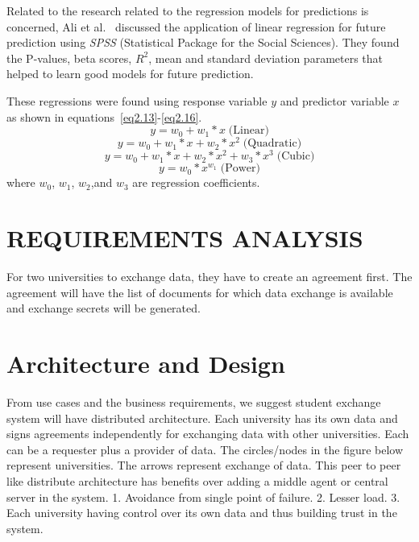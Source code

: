 \documentclass[12pt,a4paper,oneside]{book} %
\begin{document}
Related to the \cite{umair} research related to the regression models for predictions is concerned, Ali et al.~\cite{ali} discussed the application of linear regression for future prediction using {\it SPSS} (Statistical Package for the Social Sciences). They found the P-values, beta scores, $R^2$, mean and standard deviation parameters that helped to learn good models for future prediction.

These regressions were found using response variable $y$ and predictor variable $x$ as shown in equations~\ref{eq2.13}-\ref{eq2.16}.
%
\begin{equation}
  y  =  w_0 + w_1 * x \; \mbox{(Linear)}
  \label{eq2.13}
\end{equation}
%
\begin{equation}
  y = w_0 + w_1 * x + w_2 * x^2 \; \mbox{(Quadratic)}
  \label{eq2.14}
\end{equation}
%
\begin{equation}
  y = w_0 + w_1 * x + w_2 * x^2 + w_3 * x^3 \; \mbox{(Cubic)}
  \label{eq2.15}
\end{equation}
%
\begin{equation}
  y = w_0 * x^{w_1} \; \mbox{(Power)}
  \label{eq2.16}
\end{equation}
%
\noindent where $w_0$, $w_1$, $w_2$,and $w_3$ are regression coefficients.

\chapter{REQUIREMENTS ANALYSIS}\label{c-requirements-analysis}
For two universities to exchange data, they have to create an agreement first. The agreement will have the list of documents for which data exchange is available and exchange secrets will be generated.

\chapter{Architecture and Design}\label{c-architecture-design}
From use cases and the business requirements, we suggest student exchange system will have distributed architecture. Each university has its own data and signs agreements independently for exchanging data with other universities. Each can be a requester plus a provider of data. The circles/nodes in the figure below represent universities. The arrows represent exchange of data.
This peer to peer like distribute architecture has benefits over adding a middle agent or central server in the system.
1.	Avoidance from single point of failure.
2.	Lesser load.
3.	Each university having control over its own data and thus building trust in the system.
\end{document}
